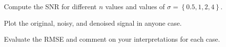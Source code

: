\vspace{0.5cm}

\begin{tcolorbox}[colback=blue!5!white,colframe=blue!75!black,title=Problem 3.a]
    Compute the SNR for different $n$ values and values of $\sigma = \left \lbrace 0.5, 1, 2, 4 \right \rbrace$.
\end{tcolorbox}

\begin{tcolorbox}[colback=blue!5!white,colframe=blue!75!black,title=Problem 3.b]
    Plot the original, noisy, and denoised signal in anyone case.
\end{tcolorbox}


\begin{tcolorbox}[colback=blue!5!white,colframe=blue!75!black,title=Problem 3.c]
    Evaluate the RMSE and comment on your interpretations for each case.

\end{tcolorbox}
